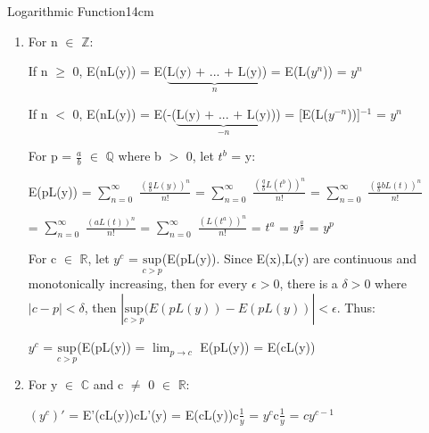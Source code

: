 \begin{definition}{Logarithmic Function}{14cm}
\begin{enumerate}[label=(\alph*), leftmargin=1.5cm, itemsep=0.1cm]
            \item For n $\in$ $\mathbb{Z}$:
            
                \hspace{0.3cm}
                If n $\geq$ 0,
                E(nL(y)) = E($\underbrace{\text{L(y) + ... + L(y)}}_{n}$)
                = E(L($y^n$)) = $y^n$

                \hspace{0.3cm}
                If n $<$ 0,
                E(nL(y)) = E(-($\underbrace{\text{L(y) + ... + L(y)}}_{-n}$))
                = [E(L($y^{-n}$))]$^{-1}$ = $y^n$

                For p = $\frac{a}{b}$ $\in$ $\mathbb{Q}$ where b $>$ 0,
                let $t^b$ = y:

                \hspace{0.5cm}
                E(pL(y))
                = $\sum_{n=0}^{\infty}$ $\frac{(\frac{a}{b}L(y))^n}{n!}$
                = $\sum_{n=0}^{\infty}$ $\frac{(\frac{q}{b}L(t^b))^n}{n!}$
                = $\sum_{n=0}^{\infty}$ $\frac{(\frac{a}{b}bL(t))^n}{n!}$

                \hspace{2.3cm}
                = $\sum_{n=0}^{\infty}$ $\frac{(aL(t))^n}{n!}$
                = $\sum_{n=0}^{\infty}$ $\frac{(L(t^a))^n}{n!}$
                = $t^a$
                = $y^{\frac{a}{b}}$ = $y^p$

                For c $\in$ $\mathbb{R}$, let $y^c$
                = $\underset{c > p}{\text{sup}}$(E(pL(y)).
                Since E(x),L(y) are continuous and monotonically increasing,
                then for every $\epsilon > 0$, there is a $\delta > 0$
                where $|c-p| < \delta$, then
                $|\underset{c>p}{\text{sup}}(E(pL(y)) - E(pL(y))| < \epsilon$.
                Thus:

                \hspace{0.5cm}
                $y^c$ = $\underset{c > p}{\text{sup}}$(E(pL(y))
                = $\lim_{p \rightarrow c}$ E(pL(y))
                = E(cL(y))

            \item For y $\in$ $\mathbb{C}$ and c $\not =$ 0 $\in$ $\mathbb{R}$:
            
                \hspace{0.5cm}
                $(y^c)'$ = E'(cL(y))cL'(y)
                = E(cL(y))c$\frac{1}{y}$
                = $y^c$c$\frac{1}{y}$
                = $c y^{c-1}$


\end{enumerate}
\end{definition}
